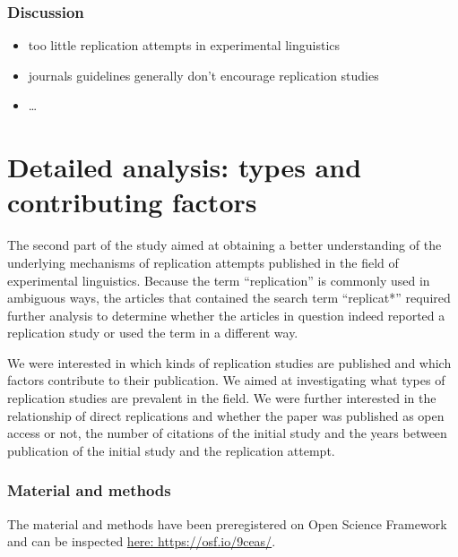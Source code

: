 \documentclass[]{elsarticle} %
\providecommand{\tightlist}{%
  \setlength{\itemsep}{0pt}\setlength{\parskip}{0pt}}
\begin{document}
\hypertarget{discussion}{%
\subsubsection{Discussion}\label{discussion}}

\begin{itemize}
\tightlist
\item
  too little replication attempts in experimental linguistics
\item
  journals guidelines generally don't encourage replication studies
\item
  \ldots{}
\end{itemize}

\hypertarget{detailed-analysis-types-and-contributing-factors}{%
\section{Detailed analysis: types and contributing
factors}\label{detailed-analysis-types-and-contributing-factors}}

The second part of the study aimed at obtaining a better understanding
of the underlying mechanisms of replication attempts published in the
field of experimental linguistics. Because the term ``replication'' is
commonly used in ambiguous ways, the articles that contained the search
term ``replicat*'' required further analysis to determine whether the
articles in question indeed reported a replication study or used the
term in a different way.

We were interested in which kinds of replication studies are published
and which factors contribute to their publication. We aimed at
investigating what types of replication studies are prevalent in the
field. We were further interested in the relationship of direct
replications and whether the paper was published as open access or not,
the number of citations of the initial study and the years between
publication of the initial study and the replication attempt.

\hypertarget{material-and-methods-1}{%
\subsubsection{Material and methods}\label{material-and-methods-1}}

The material and methods have been preregistered on Open Science
Framework and can be inspected \href{https://osf.io/9ceas/}{here:
https://osf.io/9ceas/}.
\end{document}

